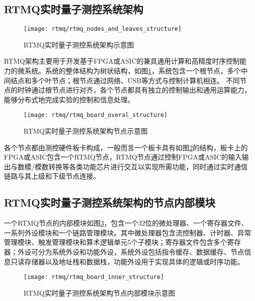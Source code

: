 \subsection[RTMQ实时量子测控系统架构]{RTMQ实时量子测控系统架构\label{section:rtmq_architecture}}

\begin{figure}
    \centering
    \texttt{[image: rtmq/rtmq\_nodes\_and\_leaves\_structure]}
    \caption[RTMQ实时量子测控系统架构示意图]{RTMQ实时量子测控系统架构示意图\label{fig:rtmq_nodes_and_leaves_structure}}
\end{figure}

RTMQ架构主要用于开发基于FPGA或ASIC的兼具通用计算和高精度时序控制能力的微系统。系统的整体结构为树状结构，如图\ref{fig:rtmq_nodes_and_leaves_structure}，系统包含一个根节点，多个中间结点和多个叶节点；根节点通过网络、USB等方式与控制计算机相连。
不同节点的时钟通过根节点进行对齐，各个节点都具有独立的控制输出和通用运算能力，能够分布式地完成实验的控制和信息处理。

\begin{figure}
    \centering
    \texttt{[image: rtmq/rtmq\_board\_overal\_structure]}
    \caption[RTMQ实时量子测控系统架构节点示意图]{RTMQ实时量子测控系统架构节点示意图\label{fig:rtmq_board_overal_structure}}
\end{figure}

各个节点都由测控硬件板卡构成，一般而言一个板卡具有如图\ref{fig:rtmq_board_overal_structure}的结构，板卡上的FPGA或ASIC包含一个RTMQ节点，RTMQ节点通过控制FPGA或ASIC的输入输出与数模/模数转换等各类功能芯片进行交互以实现所需功能，同时通过实时通信链路与其上级和下级节点连接。



\subsection[RTMQ实时量子测控系统架构的节点内部模块]{RTMQ实时量子测控系统架构的节点内部模块\label{section:rtmq_inner_module}}



一个RTMQ节点的内部模块如图\ref{fig:rtmq_board_inner_structure}，包含一个32位的微处理器、一个寄存器文件、一系列外设模块和一个链路管理模块。其中微处理器包含流控制器、计时器、异常管理模块、触发管理模块和算术逻辑单元5个子模块；寄存器文件包含多个寄存器；外设可分为系统外设和功能外设，系统外设包括指令缓存、数据缓存、节点信息只读存储器以及地址栈和数据栈，功能外设用于实现具体的逻辑或时序功能。

\begin{figure}
    \centering
    \texttt{[image: rtmq/rtmq\_board\_inner\_structure]}
    \caption[RTMQ实时量子测控系统架构节点内部模块示意图]{RTMQ实时量子测控系统架构节点内部模块示意图\label{fig:rtmq_board_inner_structure}}
\end{figure}

